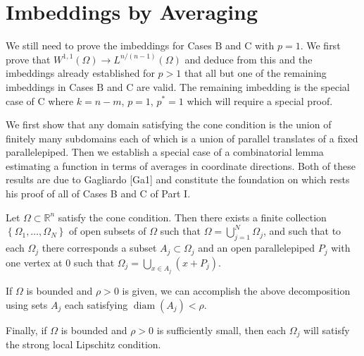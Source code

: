 \section{Imbeddings by Averaging}

\begin{para}
  We still need to prove the imbeddings for Cases $\mathrm{B}$ and $\mathrm{C}$ with $p=1$.
  We first prove that $W^{1,1}(\Omega) \rightarrow L^{n /(n-1)}(\Omega)$ and deduce from this and 
  the imbeddings already established for $p>1$ that all but one of the remaining imbeddings in 
  Cases $\mathrm{B}$ and $\mathrm{C}$ are valid. The remaining imbedding is the special case
  of $\mathrm{C}$ where $k=n-m$, $p=1$, $p^*=1$ which will require a special proof.
  
  We first show that any domain satisfying the cone condition is the union of finitely many 
  subdomains each of which is a union of parallel translates of a fixed parallelepiped.
  Then we establish a special case of a combinatorial lemma estimating a function in terms of
  averages in coordinate directions. Both of these results are due to Gagliardo [Ga1] and
  constitute the foundation on which rests his proof of all of Cases B and C of Part I.
\end{para}


\begin{lemma}
  Let $\Omega \subset \mathbb{R}^n$ satisfy the cone condition. Then there exists a finite 
  collection $\left\{\Omega_1, \ldots, \Omega_N\right\}$ of open subsets of $\Omega$ such
  that $\Omega=\bigcup_{j=1}^N \Omega_j$, and such that to each $\Omega_j$ there corresponds a 
  subset $A_j \subset \Omega_j$ and an open parallelepiped $P_j$ with one vertex at 0 such that 
  $\Omega_j=\bigcup_{x \in A_j}\left(x+P_j\right)$.
  
  If $\Omega$ is bounded and $\rho>0$ is given, we can accomplish the above decomposition using 
  sets $A_j$ each satisfying $\operatorname{diam}\left(A_j\right)<\rho$.
  
  Finally, if $\Omega$ is bounded and $\rho>0$ is sufficiently small, then each $\Omega_j$ will 
  satisfy the strong local Lipschitz condition.
\end{lemma}

